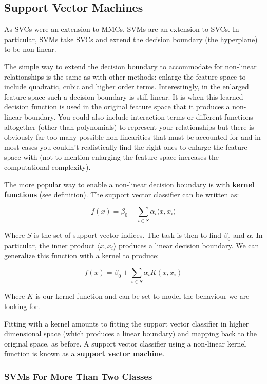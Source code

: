 \subsection{Support Vector Machines}

As SVCs were an extension to MMCs, SVMs are an extension to SVCs. In particular, SVMs take SVCs and extend the decision boundary (the hyperplane) to be non-linear.

The simple way to extend the decision boundary to accommodate for non-linear relationships is the same as with other methods: enlarge the feature space to include quadratic, cubic and higher order terms. Interestingly, in the enlarged feature space such a decision boundary is still linear. It is when this learned decision function is used in the original feature space that it produces a non-linear boundary. You could also include interaction terms or different functions altogether (other than polynomials) to represent your relationships but there is obviously far too many possible non-linearities that must be accounted for and in most cases you couldn't realistically find the right ones to enlarge the feature space with (not to mention enlarging the feature space increases the computational complexity).

The more popular way to enable a non-linear decision boundary is with \textbf{kernel functions} (see definition). The support vector classifier can be written as:

$$ f(x) = \beta_{0} + \sum_{i\in S}\alpha_{i} \langle x,x_{i} \rangle $$

Where $S$ is the set of support vector indices. The task is then to find $\beta_{0}$ and $\alpha$. In particular, the inner product $\langle x,x_{i} \rangle$ produces a linear decision boundary. We can generalize this function with a kernel to produce:

$$ f(x) = \beta_{0} + \sum_{i\in S}\alpha_{i} K(x,x_{i}) $$

Where $K$ is our kernel function and can be set to model the behaviour we are looking for.

Fitting with a kernel amounts to fitting the support vector classifier in higher dimensional space (which produces a linear boundary) and mapping back to the original space, as before. A support vector classifier using a non-linear kernel function is known as a \textbf{support vector machine}.

\subsubsection{SVMs For More Than Two Classes}


